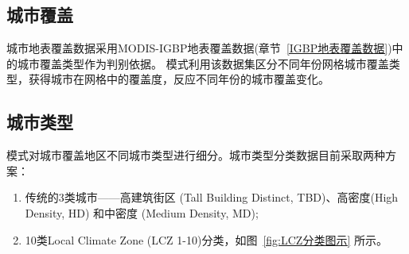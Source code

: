 \subsection{城市覆盖}\label{城市覆盖}
城市地表覆盖数据采用MODIS-IGBP地表覆盖数据(章节~\ref{IGBP地表覆盖数据})中的城市覆盖类型作为判别依据。
模式利用该数据集区分不同年份网格城市覆盖类型，获得城市在网格中的覆盖度，反应不同年份的城市覆盖变化。


\subsection{城市类型}\label{城市类型}
模式对城市覆盖地区不同城市类型进行细分。城市类型分类数据目前采取两种方案：
\begin{enumerate}
  \item 传统的3类城市——高建筑街区 (Tall Building Distinct, TBD)、高密度(High Density, HD) 和中密度 (Medium Density, MD);
  \item 10类Local Climate Zone (LCZ 1-10)分类，如图~\ref{fig:LCZ分类图示}  所示。
\end{enumerate}


